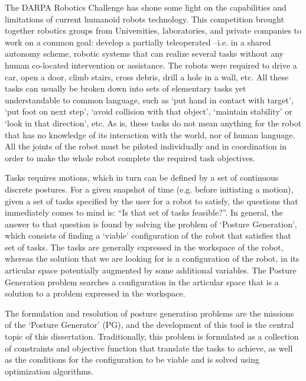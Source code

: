 The DARPA Robotics Challenge has shone some light on the capabilities and limitations of current humanoid robots technology.
This competition brought together robotics groups from Universities, laboratories, and private companies to work on a common goal: develop a partially teleoperated --i.e. in a shared autonomy scheme, robotic systems that can realize several tasks without any human co-located intervention or assistance.
The robots were required to drive a car, open a door, climb stairs, cross debris, drill a hole in a wall, etc.
All these tasks can usually be broken down into sets of elementary tasks yet understandable to common language, such as `put hand in contact with target', `put foot on next step', `avoid collision with that object', `maintain stability' or `look in that direction', etc.
As is, these tasks do not mean anything for the robot that has no knowledge of its interaction with the world, nor of human language.
All the joints of the robot must be piloted individually and in coordination in order to make the whole robot complete the required task objectives.

Tasks requires motions, which in turn can be defined by a set of continuous discrete postures. For a given snapshot of time (e.g. before initiating a motion), given a set of tasks specified by the user for a robot to satisfy, the questions that immediately comes to mind is: ``Is that set of tasks feasible?''.
In general, the answer to that question is found by solving the problem of `Posture Generation', which consists of finding a `viable' configuration of the robot that satisfies that set of tasks.
The tasks are generally expressed in the workspace of the robot, whereas the solution that we are looking for is a configuration of the robot, in its articular space potentially augmented by some additional variables. %
The Posture Generation problem searches a configuration in the articular space that is a solution to a problem expressed in the workspace.

The formulation and resolution of posture generation problems are the missions of the `Posture Generator' (PG), and the development of this tool is the central topic of this dissertation.
Traditionally, this problem is formulated as a collection of constraints and objective function that translate the tasks to achieve, as well as the conditions for the configuration to be viable and is solved using optimization algorithms.

